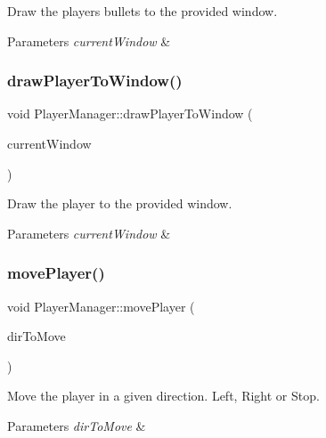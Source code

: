 Draw the player\textquotesingle{}s bullets to the provided window. 


\begin{DoxyParams}{Parameters}
{\em current\+Window} & \\
\hline
\end{DoxyParams}
\mbox{\label{class_player_manager_a8dfbc91721f7c9cfeae80ae7fa89602e}} 
\subsubsection{\texorpdfstring{draw\+Player\+To\+Window()}{drawPlayerToWindow()}}
{\footnotesize\ttfamily void Player\+Manager\+::draw\+Player\+To\+Window (\begin{DoxyParamCaption}\item[{sf\+::\+Render\+Window $\ast$}]{current\+Window }\end{DoxyParamCaption})}



Draw the player to the provided window. 


\begin{DoxyParams}{Parameters}
{\em current\+Window} & \\
\hline
\end{DoxyParams}
\mbox{\label{class_player_manager_a95358a4f97cf343f5d5d01a440c5dc76}} 
\subsubsection{\texorpdfstring{move\+Player()}{movePlayer()}}
{\footnotesize\ttfamily void Player\+Manager\+::move\+Player (\begin{DoxyParamCaption}\item[{\hyperlink{_player_manager_8h_a00ec4eba48da32d6cbdf827185fd3d34}{Move\+Direction}}]{dir\+To\+Move }\end{DoxyParamCaption})}



Move the player in a given direction. Left, Right or Stop. 


\begin{DoxyParams}{Parameters}
{\em dir\+To\+Move} & \\
\hline
\end{DoxyParams}
\mbox{\label{class_player_manager_a7a61c6484a3dd12293d2481c5f61fb71}} 
